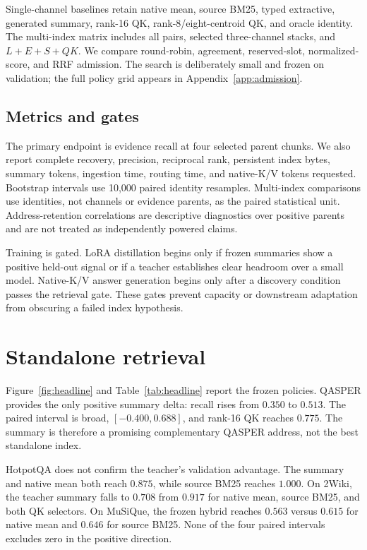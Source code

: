 \documentclass[11pt]{article}
\newcommand{\kv}{K/V\xspace}
\begin{document}
Single-channel baselines retain native mean, source BM25, typed extractive,
generated summary, rank-16 QK, rank-8/eight-centroid QK, and oracle identity.
The multi-index matrix includes all pairs, selected three-channel stacks, and
$L+E+S+QK$. We compare round-robin, agreement, reserved-slot, normalized-score,
and RRF admission. The search is deliberately small and frozen on validation;
the full policy grid appears in Appendix~\ref{app:admission}.

\subsection{Metrics and gates}

The primary endpoint is evidence recall at four selected parent chunks. We also report complete recovery, precision, reciprocal rank, persistent index bytes, summary tokens, ingestion time, routing time, and native-\kv tokens requested. Bootstrap intervals use 10,000 paired identity resamples. Multi-index comparisons use identities, not channels or evidence parents, as the paired statistical unit. Address-retention correlations are descriptive diagnostics over positive parents and are not treated as independently powered claims.

Training is gated. LoRA distillation begins only if frozen summaries show a positive held-out signal or if a teacher establishes clear headroom over a small model. Native-\kv answer generation begins only after a discovery condition passes the retrieval gate. These gates prevent capacity or downstream adaptation from obscuring a failed index hypothesis.

\section{Standalone retrieval}

Figure~\ref{fig:headline} and Table~\ref{tab:headline} report the frozen policies. QASPER provides the only positive summary delta: recall rises from $0.350$ to $0.513$. The paired interval is broad, $[-0.400,0.688]$, and rank-16 QK reaches $0.775$. The summary is therefore a promising complementary QASPER address, not the best standalone index.

HotpotQA does not confirm the teacher's validation advantage. The summary and native mean both reach $0.875$, while source BM25 reaches $1.000$. On 2Wiki, the teacher summary falls to $0.708$ from $0.917$ for native mean, source BM25, and both QK selectors. On MuSiQue, the frozen hybrid reaches $0.563$ versus $0.615$ for native mean and $0.646$ for source BM25. None of the four paired intervals excludes zero in the positive direction.
\end{document}
